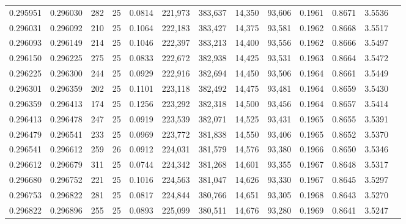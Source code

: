\begin{tabular}{rrrrrrrrrrrrr}
0.295951 & 0.296030 &   282 &  25 &                                     0.0814 & 221,973 & 383,637 &  14,350 &  93,606 & 0.1961 & 0.8671 & 3.5536 \\
0.296031 & 0.296092 &   210 &  25 &                                     0.1064 & 222,183 & 383,427 &  14,375 &  93,581 & 0.1962 & 0.8668 & 3.5517 \\
0.296093 & 0.296149 &   214 &  25 &                                     0.1046 & 222,397 & 383,213 &  14,400 &  93,556 & 0.1962 & 0.8666 & 3.5497 \\
0.296150 & 0.296225 &   275 &  25 &                                     0.0833 & 222,672 & 382,938 &  14,425 &  93,531 & 0.1963 & 0.8664 & 3.5472 \\
0.296225 & 0.296300 &   244 &  25 &                                     0.0929 & 222,916 & 382,694 &  14,450 &  93,506 & 0.1964 & 0.8661 & 3.5449 \\
0.296301 & 0.296359 &   202 &  25 &                                     0.1101 & 223,118 & 382,492 &  14,475 &  93,481 & 0.1964 & 0.8659 & 3.5430 \\
0.296359 & 0.296413 &   174 &  25 &                                     0.1256 & 223,292 & 382,318 &  14,500 &  93,456 & 0.1964 & 0.8657 & 3.5414 \\
0.296413 & 0.296478 &   247 &  25 &                                     0.0919 & 223,539 & 382,071 &  14,525 &  93,431 & 0.1965 & 0.8655 & 3.5391 \\
0.296479 & 0.296541 &   233 &  25 &                                     0.0969 & 223,772 & 381,838 &  14,550 &  93,406 & 0.1965 & 0.8652 & 3.5370 \\
0.296541 & 0.296612 &   259 &  26 &                                     0.0912 & 224,031 & 381,579 &  14,576 &  93,380 & 0.1966 & 0.8650 & 3.5346 \\
0.296612 & 0.296679 &   311 &  25 &                                     0.0744 & 224,342 & 381,268 &  14,601 &  93,355 & 0.1967 & 0.8648 & 3.5317 \\
0.296680 & 0.296752 &   221 &  25 &                                     0.1016 & 224,563 & 381,047 &  14,626 &  93,330 & 0.1967 & 0.8645 & 3.5297 \\
0.296753 & 0.296822 &   281 &  25 &                                     0.0817 & 224,844 & 380,766 &  14,651 &  93,305 & 0.1968 & 0.8643 & 3.5270 \\
0.296822 & 0.296896 &   255 &  25 &                                     0.0893 & 225,099 & 380,511 &  14,676 &  93,280 & 0.1969 & 0.8641 & 3.5247 \\

\end{tabular}
